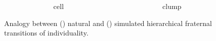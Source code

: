 \begin{figure}
\begin{columns}
\end{columns}
\vspace{1ex}
\begin{columns}
\begin{column}{0.05\textwidth}
\end{column}
\begin{column}{0.27\textwidth}
\centering
cell
\end{column}
\begin{column}{0.07\textwidth}
\end{column}
\begin{column}{0.27\textwidth}
\centering
clump
\end{column}
\end{columns}
\vspace{2ex}
\caption{Analogy between () natural and () simulated hierarchical fraternal transitions of individuality.}

\end{figure}

